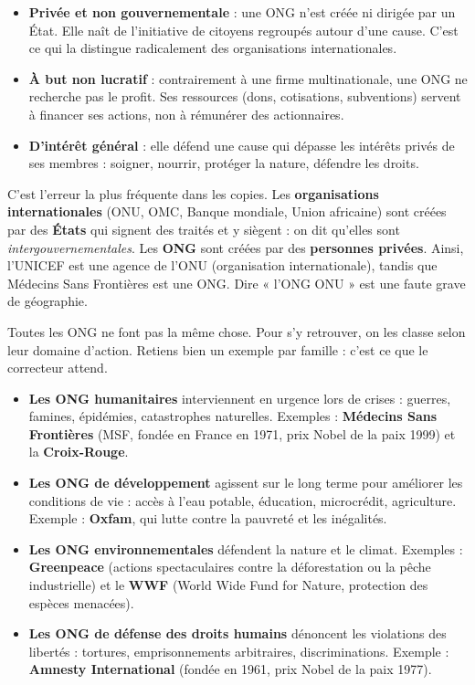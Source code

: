 \documentclass[11pt]{article}
\newcounter{popsec}
\newcounter{popsub}
\newcommand{\courssub}[1]{%
  \stepcounter{popsub}%
  \par\vspace{9pt}\noindent{\popxbold\fontsize{11.5}{13}\selectfont\color{popink}{\color{poporange}\thepopsec.\thepopsub}\hspace{6pt}#1}\par\nopagebreak\vspace{4pt}
}
\begin{document}
\begin{itemize}
\item \textbf{Privée et non gouvernementale} : une ONG n'est créée ni dirigée par un État. Elle naît de l'initiative de citoyens regroupés autour d'une cause. C'est ce qui la distingue radicalement des organisations internationales.
\item \textbf{À but non lucratif} : contrairement à une firme multinationale, une ONG ne recherche pas le profit. Ses ressources (dons, cotisations, subventions) servent à financer ses actions, non à rémunérer des actionnaires.
\item \textbf{D'intérêt général} : elle défend une cause qui dépasse les intérêts privés de ses membres : soigner, nourrir, protéger la nature, défendre les droits.
\end{itemize}

\begin{attention}
C'est l'erreur la plus fréquente dans les copies. Les \textbf{organisations internationales} (ONU, OMC, Banque mondiale, Union africaine) sont créées par des \textbf{États} qui signent des traités et y siègent : on dit qu'elles sont \emph{intergouvernementales}. Les \textbf{ONG} sont créées par des \textbf{personnes privées}. Ainsi, l'UNICEF est une agence de l'ONU (organisation internationale), tandis que Médecins Sans Frontières est une ONG. Dire « l'ONG ONU » est une faute grave de géographie.
\end{attention}

\courssub{La typologie des ONG : quatre grandes familles}

Toutes les ONG ne font pas la même chose. Pour s'y retrouver, on les classe selon leur domaine d'action. Retiens bien un exemple par famille : c'est ce que le correcteur attend.

\begin{itemize}
\item \textbf{Les ONG humanitaires} interviennent en urgence lors de crises : guerres, famines, épidémies, catastrophes naturelles. Exemples : \textbf{Médecins Sans Frontières} (MSF, fondée en France en 1971, prix Nobel de la paix 1999) et la \textbf{Croix-Rouge}.
\item \textbf{Les ONG de développement} agissent sur le long terme pour améliorer les conditions de vie : accès à l'eau potable, éducation, microcrédit, agriculture. Exemple : \textbf{Oxfam}, qui lutte contre la pauvreté et les inégalités.
\item \textbf{Les ONG environnementales} défendent la nature et le climat. Exemples : \textbf{Greenpeace} (actions spectaculaires contre la déforestation ou la pêche industrielle) et le \textbf{WWF} (World Wide Fund for Nature, protection des espèces menacées).
\item \textbf{Les ONG de défense des droits humains} dénoncent les violations des libertés : tortures, emprisonnements arbitraires, discriminations. Exemple : \textbf{Amnesty International} (fondée en 1961, prix Nobel de la paix 1977).
\end{itemize}
\end{document}
